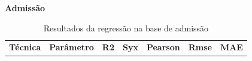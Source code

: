 \newpage
\begin{center}
    \textbf{Admissão}
\end{center}


\begin{table}[H]
\caption{Resultados da regressão na base de admissão}
\hspace*{-1.5cm} 
\begin{minipage}{\textwidth}
\centering
{\renewcommand{\arraystretch}{1.7} %

\begin{tabular}{|c|p{3cm}|p{2cm}|p{2cm}|p{2cm}|p{2cm}|p{2cm}|}
\hline
\textbf{Técnica} & \textbf{Parâmetro} & \textbf{R2} & \textbf{Syx} & \textbf{Pearson} & \textbf{Rmse} & \textbf{MAE} \\

\end{tabular}}
\end{minipage}
\end{table}
